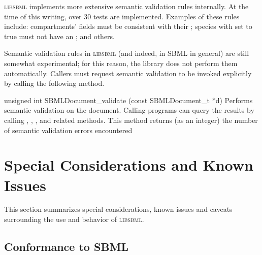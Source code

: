 \documentclass{sbmlmanual}
\newcommand{\libsbml}{\textsc{libsbml}}
\begin{document}
\libsbml{} implements more extensive semantic validation rules internally.
At the time of this writing, over 30 tests are implemented.  Examples of
these rules include: compartments'  fields must be
consistent with their ; species with
 set to true must not have an
; and others.
    
Semantic validation rules in \libsbml{} (and indeed, in SBML in general)
are still somewhat experimental; for this reason, the library does not
perform them automatically.  Callers must request semantic validation to be
invoked explicitly by calling the following method.


\begin{methoddef}{unsigned int SBMLDocument\_validate (const SBMLDocument\_t *d)}
  Performs semantic validation on the document.  Calling programs can query
  the results by calling ,
  ,
  , and related methods.  This method
  returns (as an integer) the number of semantic validation errors
  encountered
\end{methoddef}

%



\section{Special Considerations and Known Issues}
\label{sec:special-considerations}

This section summarizes special considerations, known issues and caveats
surrounding the use and behavior of \libsbml{}.


\subsection{Conformance to SBML}
\end{document}
